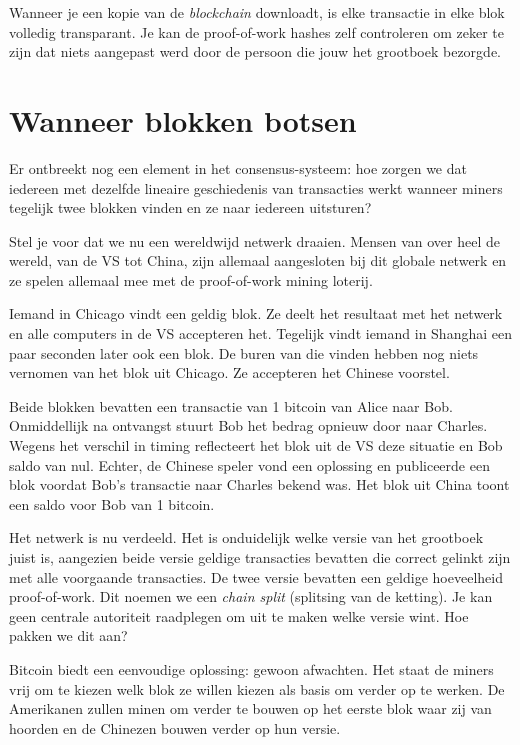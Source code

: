 Wanneer je een kopie van de \textit{blockchain} downloadt, is elke transactie in elke blok volledig transparant. Je kan de proof-of-work hashes zelf controleren om zeker te zijn dat niets aangepast werd door de persoon die jouw het grootboek bezorgde.

\section{Wanneer blokken botsen}
Er ontbreekt nog een element in het consensus-systeem: hoe zorgen we dat iedereen met dezelfde lineaire geschiedenis van transacties werkt wanneer miners tegelijk twee blokken vinden en ze naar iedereen uitsturen?

Stel je voor dat we nu een wereldwijd netwerk draaien. Mensen van over heel de wereld, van de VS tot China, zijn allemaal aangesloten bij dit globale netwerk en ze spelen allemaal mee met de proof-of-work mining loterij.

Iemand in Chicago vindt een geldig blok. Ze deelt het resultaat met het netwerk en alle computers in de VS accepteren het. Tegelijk vindt iemand in Shanghai een paar seconden later ook een blok. De buren van die vinden hebben nog niets vernomen van het blok uit Chicago. Ze accepteren het Chinese voorstel.

Beide blokken bevatten een transactie van 1 bitcoin van Alice naar Bob. Onmiddellijk na ontvangst stuurt Bob het bedrag opnieuw door naar Charles. Wegens het verschil in timing reflecteert het blok uit de VS deze situatie en Bob saldo van nul. Echter, de Chinese speler vond een oplossing en publiceerde een blok voordat Bob’s transactie naar Charles bekend was. Het blok uit China toont een saldo voor Bob van 1 bitcoin.

Het netwerk is nu verdeeld. Het is onduidelijk welke versie van het grootboek juist is, aangezien beide versie geldige transacties bevatten die correct gelinkt zijn met alle voorgaande transacties. De twee versie bevatten een geldige hoeveelheid proof-of-work. Dit noemen we een \textit{chain split} (splitsing van de ketting). Je kan geen centrale autoriteit raadplegen om uit te maken welke versie wint. Hoe pakken we dit aan?

Bitcoin biedt een eenvoudige oplossing: gewoon afwachten. Het staat de miners vrij om te kiezen welk blok ze willen kiezen als basis om verder op te werken. De Amerikanen zullen minen om verder te bouwen op het eerste blok waar zij van hoorden en de Chinezen bouwen verder op hun versie.

